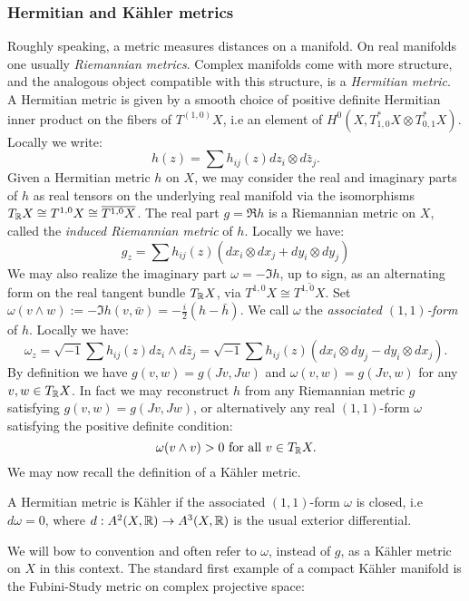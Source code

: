 \subsubsection{Hermitian and K\"ahler metrics}
Roughly speaking, a metric measures distances on a manifold. On real manifolds one usually \textit{Riemannian metrics}. Complex manifolds come with more structure, and the analogous object compatible with this structure, is a \textit{Hermitian metric}. A Hermitian metric is given by a smooth choice of positive definite Hermitian inner product on the fibers of \(T^{(1,0)}X\), i.e an element of \(H^0(X, T^*_{1,0} X \otimes T^*_{0,1} X) \). Locally we write:
\[
h(z) = \sum h_{ij}(z) dz_i \otimes d\bar{z}_j.
\]
Given a Hermitian metric \(h\) on \(X\), we may consider the real and imaginary parts of \(h\) as real tensors on the underlying real manifold via the isomorphisms \(T_{\mathbb{R}} X \cong T^{1,0}X \cong \overline{T^{1,0}X}\). The real part \(g = \Re h\) is a Riemannian metric on \(X\), called the \textit{induced Riemannian metric} of \(h\). Locally we have:
\[
g_z = \sum h_{ij}(z) ( dx_i \otimes d x_j + dy_i \otimes dy_j)
\]
We may also realize the imaginary part \(\omega = - \Im h\), up to sign, as an alternating form on the real tangent bundle \(T_{\mathbb{R}} X\), via \(T^{1,0}X \cong \overline{T^{1,0}X}\). Set \(\omega ( v \wedge w ) :=  - \Im h(v, \bar{w}) = - \frac{i}{2} ( h - \bar{h} )  \). We call \(\omega\) the \textit{associated \((1,1)\)-form} of \(h\). Locally we have:
\[
\omega_z = \sqrt{-1} \sum h_{ij}(z) dz_i \wedge d\bar{z}_j = \sqrt{-1} \sum h_{ij}(z) ( dx_i \otimes dy_j - dy_i \otimes dx_j). 
\]
By definition we have \(g(v,w) = g(Jv,Jw)\) and \(\omega(v,w) = g(Jv,w) \) for any \(v,w \in T_{\mathbb{R}} X\). In fact we may reconstruct \(h\) from any Riemannian metric \(g\) satisfying \(g(v,w) = g(Jv,Jw)\), or alternatively any real \((1,1)\)-form \(\omega\) satisfying the positive definite condition:
\[
\omega( v \wedge v)  > 0 \text{ for all } v \in T_{\mathbb{R}} X.
\]
We may now recall the definition of a K\"ahler metric.
\begin{definition}
A Hermitian metric is K\"ahler if the associated \((1,1)\)-form \(\omega\) is closed, i.e \(d \omega = 0\), where \(d: A^2(X,\mathbb{R}) \to A^3(X,\mathbb{R})\) is the usual exterior differential.
\end{definition}
We will bow to convention and often refer to \(\omega\), instead of \(g\), as a K\"ahler metric on \(X\) in this context. The standard first example of a compact K\"ahler manifold is the Fubini-Study metric on complex projective space:
